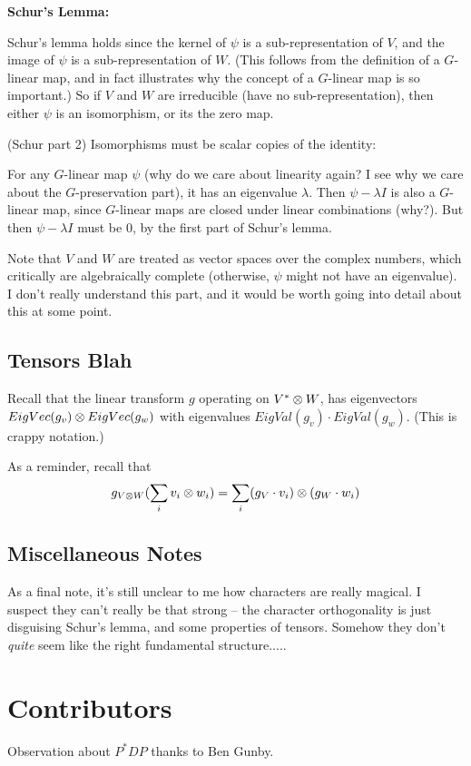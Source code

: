 \textbf{Schur's Lemma:}

Schur's lemma holds since the kernel of $\psi$ is a
sub-representation of $V$, and the image of $\psi$ is a
sub-representation of $W$. (This follows from the definition of a
$G$-linear map, and in fact illustrates why the concept of a
$G$-linear map is so important.) So if $V$ and $W$ are irreducible
(have no sub-representation), then either $\psi$ is an
isomorphism, or its the zero map.

(Schur part 2) Isomorphisms must be scalar copies of the
identity:

For any $G$-linear map $\psi$ (why do we care about linearity
again? I see why we care about the $G$-preservation part),
it has an eigenvalue $\lambda$. Then $\psi-\lambda I$ is also a
$G$-linear map, since $G$-linear maps are closed under linear
combinations (why?). But then $\psi - \lambda I$ must be $0$, by
the first part of Schur's lemma. 

Note that $V$ and $W$ are treated as vector spaces over the
complex numbers, which critically are algebraically complete
(otherwise, $\psi$ might not have an eigenvalue). I don't really
understand this part, and it would be worth going into detail
about this at some point.


\subsection{Tensors Blah} 
Recall that the linear transform $g$ operating on $V^{*} \otimes W$,
has eigenvectors $EigVec(g_v) \otimes EigVec(g_w)$ with
eigenvalues $EigVal(g_v) \cdot EigVal(g_w)$. (This is crappy
notation.)

As a reminder, recall that 
\[ g_{V \otimes W} (\sum_{i} v_i \otimes w_i ) = \sum_i (g_V
\cdot v_i) \otimes (g_W \cdot w_i) \]

\subsection{Miscellaneous Notes}
As a final note, it's still unclear to me how characters are
really magical. I suspect they can't really be that strong -- the
character orthogonality is just disguising Schur's lemma, and
some properties of tensors. Somehow they don't \textit{quite}
seem like the right fundamental structure.....
\section{Contributors}
Observation about $P^{*}DP$ thanks to Ben Gunby.

